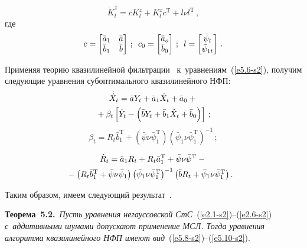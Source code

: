 \begin{multicols}{2}
\begin{equation}
 \dot  K_t^{\bar z} = c K_t^z +K_t^z c^{\mathrm{T}} + l\nu l^{\mathrm{T}}\,,
 \label{e5.6-s2}
 \end{equation}
где
    \begin{equation*}
    c=\begin{bmatrix}
    \bar a_1&\bar a\\
    \bar b_1&\bar b\end{bmatrix}\,; \enskip
    c_0=\begin{bmatrix}
    \bar a_o\\
    \bar b_0\end{bmatrix}\,;\enskip
    l=\begin{bmatrix}
    \bar \psi_t\\
    \bar\psi_{1t}\end{bmatrix}\,.
    \end{equation*}

Применяя теорию квазилинейной фильтрации~\cite{3-s2} 
к~уравнениям~(\ref{e5.6-s2}), 
получим сле\-ду\-ющие уравнения субоптимального квазилинейного НФП:
    \begin{multline}
    \dot{\hat X}_t = \bar a Y_t +\bar a_1 \hat X_t + \bar a_0 + {}\\
    {}+
    \beta_t \left[ \dot Y_t - \left( \bar b Y_t +\bar b_1 \hat X_t + \bar b_0\right) \right]\,;
    \label{e5.8-s2}
    \end{multline}
\begin{equation}
\beta_t = R_t \bar b_1^{\mathrm{T}} +
\left(\bar\psi\nu\bar\psi_1^{\mathrm{T}}\right) 
\left(\bar \psi_1 \nu \bar \psi_1^{\mathrm{T}}\right)^{-1}\,;
\label{e5.9-s2}
\end{equation}

\vspace*{-12pt}

\noindent
\begin{multline}
 \dot R_t = \bar a_1 R_t + R_t \bar a_1^{\mathrm{T}} +
 \bar\psi\nu\bar\psi^{\mathrm{T}} -{}\\
 \hspace*{-3mm}{}- 
 \left(R_t \bar b_1^{\mathrm{T}} +\bar\psi\nu\bar\psi_1\right)
 \left(\bar\psi_1 \nu\bar\psi_1^{\mathrm{T}}\right)^{-1} 
 \left( \bar b R_t +\bar\psi_1\nu\bar\psi_1^{\mathrm{T}}\right).
 \label{e5.10-s2}
 \end{multline}

Таким образом, имеем следующий результат~\cite{1-s2}.

\smallskip

\noindent
\textbf{Теорема~5.2.}\
\textit{Пусть уравнения негауссовской СтС}~(\ref{e2.1-s2})--(\ref{e2.6-s2}) 
\textit{с~аддитивными шумами  допускают применение МСЛ. Тогда уравнения алгоритма 
квазилинейного НФП имеют вид}~(\ref{e5.8-s2})--(\ref{e5.10-s2}).


\end{multicols}

